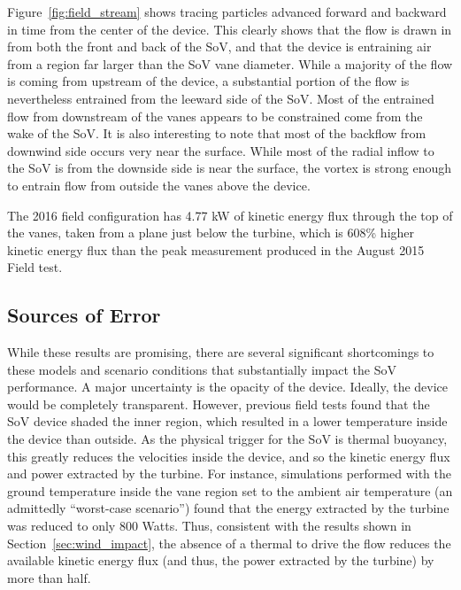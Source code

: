 Figure~\ref{fig:field_stream} shows tracing particles advanced forward
and backward in time from the center of the device. This clearly shows
that the flow is drawn in from both the front and back of the SoV, and
that the device is entraining air from a region far larger than the SoV
vane diameter.  While a majority of the flow is coming from upstream of
the device, a substantial portion of the flow is nevertheless  entrained
from the leeward side of the SoV. Most of the entrained flow from
downstream of the vanes appears to be constrained come from the wake of
the SoV. It is also interesting to note that most of the backflow from
downwind side occurs very near the surface. While most of the radial
inflow to the SoV is from the downside side is near the surface, the
vortex is strong enough to entrain flow from outside the vanes above the
device.  

The 2016 field configuration has 4.77 kW of kinetic energy flux through
the top of the vanes, taken from a plane just below the turbine, which
is 608\% higher kinetic energy flux than the peak measurement produced in
the August 2015 Field test.  

\subsection{Sources of Error}
\label{sec:field_error}
%
While these results are promising, there are several significant
shortcomings to these models and scenario conditions that substantially
impact the SoV performance. A major uncertainty is the opacity of the
device. Ideally, the device 
would be completely transparent. However, previous field tests
found that the SoV device shaded the inner region, which resulted in a
lower temperature inside the device than 
outside. As the physical trigger for the SoV is thermal buoyancy, this
greatly reduces the velocities inside the device, and so the kinetic
energy flux and power extracted by the turbine. For instance,
simulations performed with the ground temperature inside the vane region
set to the ambient air temperature (an admittedly ``worst-case
scenario'') found that the energy extracted by the turbine was reduced
to only 800 Watts. Thus, consistent with the results shown in
Section~\ref{sec:wind_impact}, the absence of a thermal to drive the
flow reduces the available kinetic energy flux (and thus, the power
extracted by the turbine) by more than half. 


